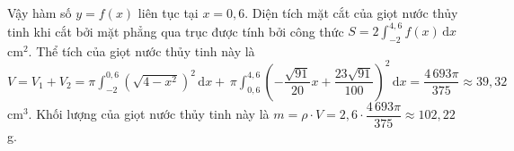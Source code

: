 \begin{ex}
{\begin{itemchoice}
			Vậy hàm số $y=f(x)$ liên tục tại  $x=0{,}6$.
			 \itemch Diện tích mặt cắt của giọt nước thủy tinh khi cắt bởi mặt phẳng qua trục được tính bởi công thức $S=2\displaystyle\int_{-2}^{4,6}f(x)\,\mathrm{d}x$ cm$^2$.
			 \itemch Thể tích của giọt nước thủy tinh này là\\
			 $V=V_1+V_2=\pi\displaystyle\int_{-2}^{0{,}6}{\left(\sqrt{4-x^2}\right)^2\,\mathrm{d}x+}\,\pi\displaystyle\int_{0{,}6}^{4{,}6}{\left(-\dfrac{\sqrt{91}}{20}x+\dfrac{23\sqrt{91}}{100}\right)^2\,\mathrm{d}x}=\dfrac{4\,693\pi}{375}\approx 39{,}32$ cm$^3$.
			\itemch Khối lượng của giọt  nước thủy tinh này là $m=\rho \cdot V=2{,}6\cdot\dfrac{4\,693\pi}{375}\approx 102{,}22$ g.
		\end{itemchoice}
	} 
\end{ex}

